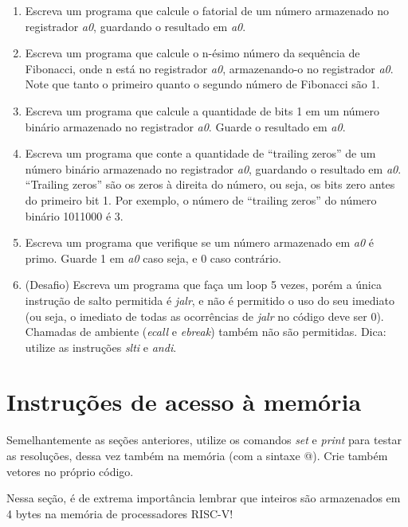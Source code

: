 \documentclass{article}
\begin{document}
\begin{enumerate}
  \item Escreva um programa que calcule o fatorial de um número armazenado no
  registrador \textit{a0}, guardando o resultado em \textit{a0}.

  \item Escreva um programa que calcule o n-ésimo número da sequência de
  Fibonacci, onde n está no registrador \textit{a0}, armazenando-o no
  registrador \textit{a0}. Note que tanto o primeiro quanto o segundo número de
  Fibonacci são 1.

  \item Escreva um programa que calcule a quantidade de bits 1 em um número
  binário armazenado no registrador \textit{a0}. Guarde o resultado em
  \textit{a0}.

  \item Escreva um programa que conte a quantidade de ``trailing zeros'' de um
  número binário armazenado no registrador \textit{a0}, guardando o resultado em
  \textit{a0}. ``Trailing zeros'' são os zeros à direita do número, ou seja, os
  bits zero antes do primeiro bit 1. Por exemplo, o número de ``trailing zeros''
  do número binário 1011000 é 3.

  \item Escreva um programa que verifique se um número armazenado em \textit{a0}
  é primo. Guarde 1 em \textit{a0} caso seja, e 0 caso contrário.

  \item (Desafio) Escreva um programa que faça um loop 5 vezes, porém a única
  instrução de salto permitida é \textit{jalr}, e não é permitido o uso do seu
  imediato (ou seja, o imediato de todas as ocorrências de \textit{jalr} no
  código deve ser 0). Chamadas de ambiente (\textit{ecall} e \textit{ebreak})
  também não são permitidas. Dica: utilize as instruções \textit{slti} e
  \textit{andi}.
\end{enumerate}

\section{Instruções de acesso à memória}

Semelhantemente as seções anteriores, utilize os comandos \textit{set} e
\textit{print} para testar as resoluções, dessa vez também na memória (com a
sintaxe @). Crie também vetores no próprio código.

Nessa seção, é de extrema importância lembrar que inteiros são armazenados em 4
bytes na memória de processadores RISC-V!
\end{document}
